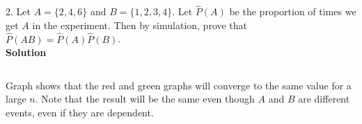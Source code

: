     2. Let  $ A = \{2, 4, 6\}$ and $B = \{ 1, 2, 3, 4 \}$. Let $\widehat{P}(A)$ be the proportion of times we get $A$ in the experiment. Then by simulation, prove that $\widehat{P}(AB) = \widehat{P}(A)\widehat{P}(B)$.\\
    \textbf{Solution} 

    \inputminted{python}{src/chapter1/2.py}
    \begin{center}  \end{center}

    Graph shows that  the red and green graphs will converge to the same value for a large $n$. Note that the result will be the same even though $A$ and $B$ are different events, even if they are dependent.\\

    


